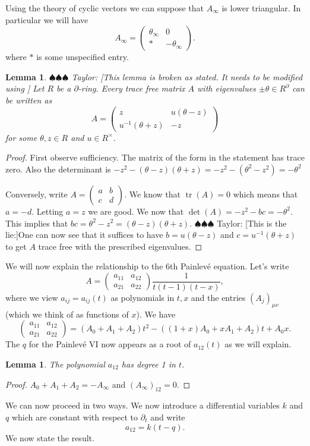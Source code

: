 \documentclass[12pt]{book}
\newcommand{\taylor}[1]{{\color{blue} \sf $\spadesuit\spadesuit\spadesuit$ Taylor: [#1]}}
\numberwithin{equation}{section}
\newtheorem{lemma}[theorem]{Lemma}
\theoremstyle{definition}
\theoremstyle{remark}
\newcommand{\tr}{\operatorname{tr}}
\begin{document}
Using the theory of cyclic vectors we can suppose that $A_{\infty}$ is lower triangular. 
In particular we will have 
$$ A_{\infty} = \begin{pmatrix} \theta_{\infty} & 0 \\
*   & -\theta_{\infty}\end{pmatrix}.$$
where $*$ is some unspecified entry.
\begin{lemma}
	\taylor{This lemma is broken as stated. It needs to be modified using \cite[\S 6]{Iwasaki1991} }
	Let $R$ be a $\partial$-ring. 
	Every trace free matrix $A$ with eigenvalues $\pm \theta \in R^{\partial}$ can be written as 
	$$A=\begin{pmatrix}
	z & u(\theta-z) \\
	u^{-1}(\theta+z) & -z
	\end{pmatrix}$$
	for some $\theta,z\in R$ and $u\in R^{\times}$.
\end{lemma}
\begin{proof}
	First observe sufficiency.
	The matrix of the form in the statement has trace zero.
	Also the determinant is $-z^2-(\theta-z)(\theta+z)=-z^2-(\theta^2-z^2)=-\theta^2$
	
	Conversely, write $A = \begin{pmatrix} a &b \\ c & d \end{pmatrix}$.
	We know that $\tr(A)=0$ which means that $a=-d$.
	Letting $a=z$ we are good.
	We now that $\det(A) = -z^2-bc=-\theta^2$. 
	This implies that $bc=\theta^2-z^2=(\theta-z)(\theta+z)$.
	\taylor{This is the lie:}One can now see that it suffices to have $b=u(\theta-z)$ and $c=u^{-1}(\theta+z)$ to get $A$ trace free with the prescribed eigenvalues. 
\end{proof}

We will now explain the relationship to the 6th Painlev\'e equation.
Let's write 
$$ A = \begin{pmatrix}
a_{11} & a_{12} \\
a_{21} & a_{22} 
\end{pmatrix} \frac{1}{t(t-1)(t-x)},$$ 
where we view $a_{ij}=a_{ij}(t)$ as polynomials in $t,x$ and the entries $(A_j)_{\mu\nu}$ (which we think of as functions of $x$). 
We have 
$$  \begin{pmatrix}
a_{11} & a_{12} \\
a_{21} & a_{22} 
\end{pmatrix} = (A_0+A_1+A_2)t^2 -((1+x)A_0 + xA_1 + A_2)t + A_0x. $$
The $q$ for the Painlev\'e VI now appears as a root of $a_{12}(t)$ as we will explain.
\begin{lemma}
	The polynomial $a_{12}$ has degree 1 in $t$. 
\end{lemma}
\begin{proof}
	$A_0+A_1+A_2=-A_{\infty}$ and $(A_{\infty})_{12}=0$.
\end{proof}
We can now proceed in two ways. 
We now introduce a differential variables $k$ and $q$ which are constant with respect to $\partial_t$ and write  
	$$a_{12} = k(t-q).$$ 
We now state the result. 
\end{document}
